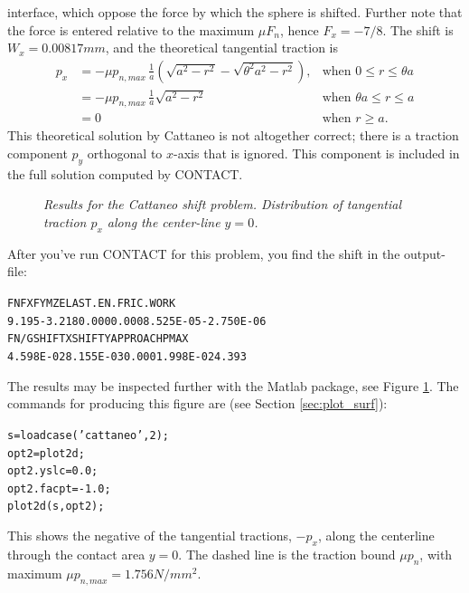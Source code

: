 \documentclass[12pt]{report}
\begin{document}
interface, which oppose the force by which the sphere is shifted. Further
note that the force is entered relative to the maximum $\mu F_n$,
hence $F_x=-7/8$. The shift is $W_x=0.00817\unit{mm}$, and the theoretical
tangential traction is
\begin{equation}
\begin{array}{rll}
 p_x &= -\mu p_{n,max} \, \frac{1}{a} \left( \sqrt{a^2-r^2} - 
                \sqrt{\theta^2 a^2-r^2} \right), &
                \mbox{when } 0 \le r \le \theta a \\[0.5ex]
     &= -\mu p_{n,max} \, \frac{1}{a} \sqrt{a^2-r^2} &
                \mbox{when } \theta a \le r \le a \\[0.5ex]
     &= 0 & \mbox{when } r \ge a.
\end{array}
\end{equation}
This theoretical solution by Cattaneo is not altogether correct; there is a
traction component $p_y$ orthogonal to $x$-axis that is ignored. This
component is included in the full solution computed by CONTACT.

\begin{figure}[bt]
\centering
{}
\caption{\em Results for the Cattaneo shift problem. Distribution of
tangential traction $p_x$ along the center-line $y=0$.}
\label{fig:cattaneo_px_y0}
\end{figure}

After you've run CONTACT for this problem, you find the shift in the
output-file:
\begin{alltt}\small
     FN          FX          FY          MZ         ELAST.EN.   FRIC.WORK
         9.195      -3.218       0.000       0.000   8.525E-05  -2.750E-06
     FN/G       SHIFT X      SHIFT Y     APPROACH     PMAX    
     4.598E-02   8.155E-03       0.000   1.998E-02       4.393
\end{alltt}
The results may be inspected further with the Matlab package, see Figure
\ref{fig:cattaneo_px_y0}. The commands for producing this figure are
(see Section \ref{sec:plot_surf}):
\begin{alltt}\small
  s = loadcase('cattaneo',2); %
  opt2 = plot2d;              %
  opt2.yslc = 0.0;
  opt2.facpt = -1.0;
  plot2d(s, opt2);
\end{alltt}
This shows the negative of the tangential tractions, $-p_x$, along the
centerline through the contact area $y=0$. The dashed line is the traction
bound $\mu p_n$, with maximum $\mu p_{n,max}=1.756\unit{N/mm^2}$.
\end{document}
